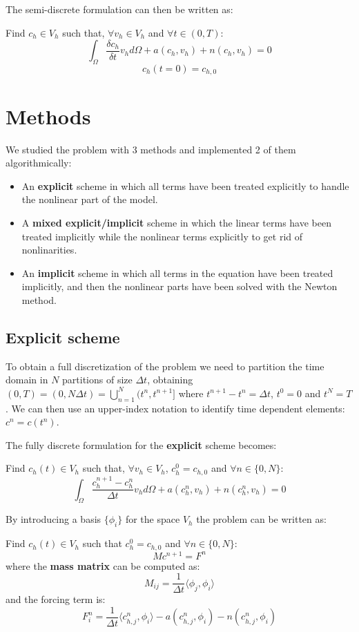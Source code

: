 \documentclass[12pt, letterpaper]{article}
\begin{document}
\noindent The semi-discrete formulation can then be written as:

\vspace{1em}
\noindent
Find $c_h\in V_h$ such that, $\forall v_h\in V_h$ and $\forall t\in(0,T)$:
$$\int_\Omega\frac{\delta c_h}{\delta t}v_hd\Omega+a(c_h,v_h)+n(c_h,v_h)=0$$
$$c_h(t=0)=c_{h,0}$$

\section{Methods}

We studied the problem with 3 methods and implemented 2 of them algorithmically:
\begin{itemize}
    \item An \textbf{explicit} scheme in which all terms have been treated explicitly to handle the nonlinear part of the model.
    \item A \textbf{mixed explicit/implicit} scheme in which the linear terms have been treated implicitly while the nonlinear terms explicitly to get rid of nonlinarities.
    \item An \textbf{implicit} scheme in which all terms in the equation have been treated implicitly, and then the nonlinear parts have been solved with the Newton method.
\end{itemize}

\subsection{Explicit scheme}
To obtain a full discretization of the problem we need to partition the time domain in $N$ partitions of size $\Delta t$, obtaining $(0, T)=(0,N\Delta t)=\bigcup_{n=1}^N(t^n, t^{n+1}]$ where $t^{n+1}-t^n=\Delta t$, $t^0=0$ and $t^N=T$. We can then use an upper-index notation to identify time dependent elements: $c^n = c(t^n)$.

\noindent The fully discrete formulation for the \textbf{explicit} scheme becomes:

\vspace{1em}
\noindent
Find $c_h(t)\in V_h$ such that, $\forall v_h\in V_h$, $c_h^0=c_{h,0}$ and $\forall n\in\{0, N\}$:
$$\int_\Omega\frac{c_h^{n+1}-c_h^n}{\Delta t}v_hd\Omega+a(c_h^n,v_h)+n(c_h^n,v_h)=0$$

\noindent By introducing a basis $\{\phi_i\}$ for the space $V_h$ the problem can be written as:

\vspace{1em}
\noindent
Find $c_h(t)\in V_h$ such that $c_h^0=c_{h,0}$ and $\forall n\in\{0, N\}$:
$$Mc^{n+1}=F^n$$
where the \textbf{mass matrix} can be computed as:
$$M_{ij}=\frac1{\Delta t}\langle\phi_j,\phi_i\rangle$$
and the forcing term is:
$$F_i^n=\frac1{\Delta t}\langle c_{h,j}^n,\phi_i\rangle-a(c_{h,j}^n,\phi_i)-n(c_{h,j}^n,\phi_i)$$
\end{document}
